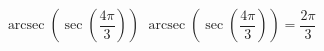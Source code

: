  {$\operatorname{arcsec}\left(\sec\left(\dfrac{4\pi}{3}\right) \right)$}
{ $\operatorname{arcsec}\left(\sec\left(\dfrac{4\pi}{3}\right) \right) = \dfrac{2\pi}{3}$}
